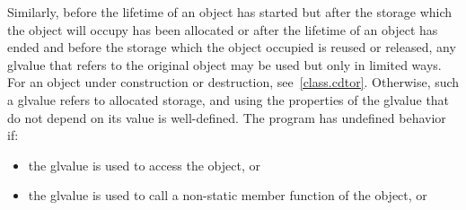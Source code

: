 \pnum
Similarly, before the lifetime of an object has started but after the
storage which the object will occupy has been allocated or after the
lifetime of an object has ended and before the storage which the object
occupied is reused or released, any glvalue that refers to the original
object may be used but only in limited ways.
For an object under construction or destruction, see~\ref{class.cdtor}.
Otherwise, such
a glvalue refers to
allocated storage, and using the
properties of the glvalue that do not depend on its value is
well-defined. The program has undefined behavior if:
\begin{itemize}
\item the glvalue is used to access the object, or
%
%
%
%
%
\item the glvalue is used to call a non-static member function of the object, or
%
%
%

\end{itemize}
